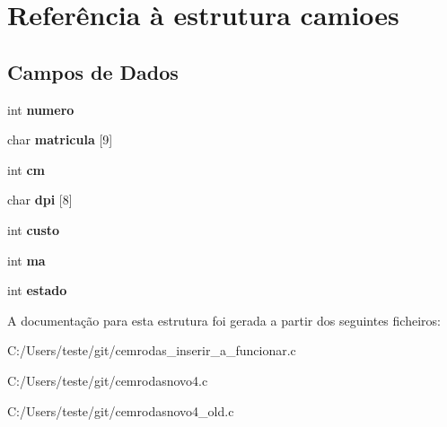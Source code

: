 \hypertarget{structcamioes}{\section{Referência à estrutura camioes}
\label{structcamioes}
}
\subsection*{Campos de Dados}
\begin{DoxyCompactItemize}
\item 
\hypertarget{structcamioes_a2c30f43104974e72e2809fb4569804b0}{int {\bfseries numero}}\label{structcamioes_a2c30f43104974e72e2809fb4569804b0}

\item 
\hypertarget{structcamioes_a0e3083e1710151292f669182e1e70215}{char {\bfseries matricula} \mbox{[}9\mbox{]}}\label{structcamioes_a0e3083e1710151292f669182e1e70215}

\item 
\hypertarget{structcamioes_a8c10fd8773d4b75976b612e2d88587cf}{int {\bfseries cm}}\label{structcamioes_a8c10fd8773d4b75976b612e2d88587cf}

\item 
\hypertarget{structcamioes_aa891d01fc7a873157d5549fa6bd8674d}{char {\bfseries dpi} \mbox{[}8\mbox{]}}\label{structcamioes_aa891d01fc7a873157d5549fa6bd8674d}

\item 
\hypertarget{structcamioes_a420b800f5434e6488ebc8a2b81d3b74b}{int {\bfseries custo}}\label{structcamioes_a420b800f5434e6488ebc8a2b81d3b74b}

\item 
\hypertarget{structcamioes_a772510714935308cfb3b2c609cca1ab7}{int {\bfseries ma}}\label{structcamioes_a772510714935308cfb3b2c609cca1ab7}

\item 
\hypertarget{structcamioes_a876d08c1d21086e4fd228744da10d028}{int {\bfseries estado}}\label{structcamioes_a876d08c1d21086e4fd228744da10d028}

\end{DoxyCompactItemize}


A documentação para esta estrutura foi gerada a partir dos seguintes ficheiros\-:\begin{DoxyCompactItemize}
\item 
C\-:/\-Users/teste/git/cemrodas\-\_\-inserir\-\_\-a\-\_\-funcionar.\-c\item 
C\-:/\-Users/teste/git/cemrodasnovo4.\-c\item 
C\-:/\-Users/teste/git/cemrodasnovo4\-\_\-old.\-c\end{DoxyCompactItemize}
